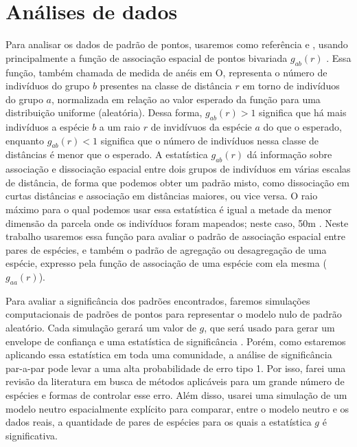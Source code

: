 \documentclass[twoside,12pt,a4paper]{report}
\begin{document}
\section{Análises de dados}

Para analisar os dados de padrão de pontos, usaremos como referência \citep{IllianBook} e
\citep{WiegandBook}, usando principalmente a função de associação espacial de pontos bivariada
$g_{ab}(r)$ \citep{IllianBook,WiegandBook,Stoyan1994}. Essa função, também chamada de medida de
anéis em O, representa o número de indivíduos do grupo $b$ presentes na classe de distância $r$ em
torno de indivíduos do grupo $a$, normalizada em relação ao valor esperado da função para uma
distribuição uniforme (aleatória). Dessa forma, $g_{ab}(r) > 1$ significa que há mais indivíduos a
espécie $b$ a um raio $r$ de invidívuos da espécie $a$ do que o esperado,
enquanto $g_{ab}(r) < 1 $ significa que o número de indivíduos nessa classe de distâncias é menor
que o esperado. A estatística $g_{ab}(r)$ dá informação sobre associação e dissociação espacial
entre dois grupos de indivíduos em várias escalas de distância, de forma que podemos obter um padrão
misto, como dissociação em curtas distâncias e associação em distâncias maiores, ou vice versa. O
raio máximo para o qual podemos usar essa estatística é igual a metade da menor dimensão da parcela
onde os indivíduos foram mapeados; neste caso, 50m \citep{IllianBook}. Neste trabalho usaremos essa
função para avaliar o padrão de associação espacial entre pares de espécies, e também o padrão de
agregação ou desagregação de uma espécie, expresso pela função de associação de uma espécie com ela
mesma ($g_{aa}(r)$).

Para avaliar a significância dos padrões encontrados, faremos simulações computacionais de padrões
de pontos para representar o modelo nulo de padrão aleatório. Cada simulação gerará um valor de
$g$, que será usado para gerar um envelope de confiança e uma estatística de significância
\citep{IllianBook,DiggleBook}. Porém, como estaremos aplicando essa estatística em toda uma
comunidade, a análise de significância par-a-par pode levar a uma alta probabilidade de erro tipo 1.
Por isso, farei uma revisão da literatura em busca de métodos aplicáveis para um grande número de
espécies e formas de controlar esse erro. Além disso, usarei uma simulação de um modelo neutro
espacialmente explícito para comparar, entre o modelo neutro e os dados reais, a quantidade de pares de espécies para os quais a estatística
$g$ é significativa.
\end{document}
